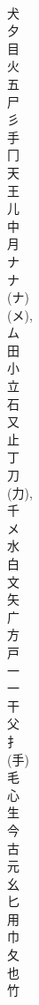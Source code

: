 \documentclass[8pt]{extreport}
\begin{document}
\begin{CJK}{UTF8}{min}
\\	犬	
\\	夕	
\\	目	
\\	火	
\\	五	
\\	尸	
\\	彡	
\\	手	
\\	冂	
\\	天	
\\	王	
\\	儿	
\\	中	
\\	月	
\\	ナ	
\\	ナ 
\\	(ナ) 
\\	(メ), 
\\	ム	
\\	田	
\\	小	
\\	立	
\\	石	
\\	又	
\\	止	
\\	丁	
\\	刀	
\\	(力), 
\\	千	
\\	メ	
\\	水	
\\	白	
\\	文	
\\	矢	
\\	广	
\\	方	
\\	戸	
\\	一 
\\	一 
\\	干	
\\	父	
\\	扌	
\\	(手) 
\\	毛	
\\	心	
\\	生	
\\	今	
\\	古	
\\	元	
\\	幺	
\\	匕	
\\	用	
\\	巾	
\\	夂	
\\	也	
\\	竹	

\end{CJK}
\end{document}
